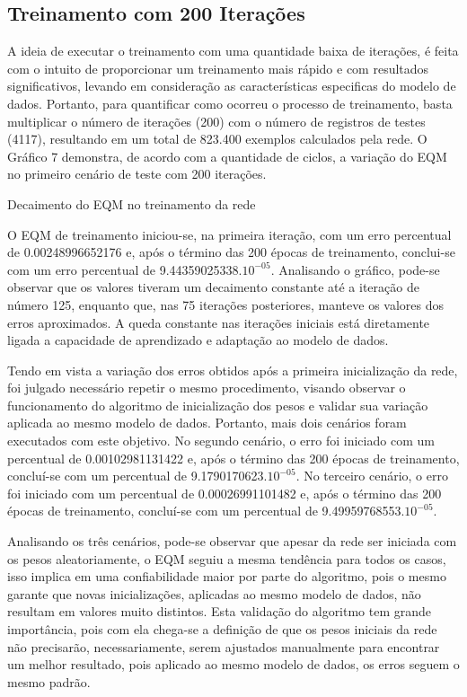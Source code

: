 \subsection{Treinamento com 200 Iterações}	
A ideia de executar o treinamento com uma quantidade baixa de iterações, é feita com o intuito de proporcionar um treinamento mais rápido e com resultados significativos, levando em consideração as características especificas do modelo de dados. Portanto, para quantificar como ocorreu o processo de treinamento, basta multiplicar o número de iterações (200) com o número de registros de testes (4117), resultando em um total de 823.400 exemplos calculados pela rede. O Gráfico 7 demonstra, de acordo com a quantidade de ciclos, a variação do EQM no primeiro cenário de teste com 200 iterações.
\begin{grafico}[h]
	\centering
	\caption{Decaimento do EQM no treinamento da rede}
	\label{lingua}
\end{grafico}

O EQM de treinamento iniciou-se, na primeira iteração, com um erro percentual de 0.00248996652176 e, após o término das 200 épocas de treinamento, conclui-se com um erro percentual de 9.44359025338.$10^{-05}$. Analisando o gráfico, pode-se observar que os valores tiveram um decaimento constante até a iteração de número 125, enquanto que, nas 75 iterações posteriores, manteve os valores dos erros aproximados. A queda constante nas iterações iniciais está diretamente ligada a capacidade de aprendizado e adaptação ao modelo de dados.

Tendo em vista a variação dos erros obtidos após a primeira inicialização da rede, foi julgado necessário repetir o mesmo procedimento, visando observar o funcionamento do algoritmo de inicialização dos pesos e validar sua variação aplicada ao mesmo modelo de dados. Portanto, mais dois cenários foram executados com este objetivo. No segundo cenário, o erro foi iniciado com um percentual de 0.00102981131422 e, após o término das 200 épocas de treinamento, concluí-se com um percentual de 9.1790170623.$10^{-05}$. No terceiro cenário, o erro foi iniciado com um percentual de 0.00026991101482 e, após o término das 200 épocas de treinamento, concluí-se com um percentual de 9.49959768553.$10^{-05}$.

Analisando os três cenários, pode-se observar que apesar da rede ser iniciada com os pesos aleatoriamente, o EQM seguiu a mesma tendência para todos os casos, isso implica em uma confiabilidade maior por parte do algoritmo, pois o mesmo garante que novas inicializações, aplicadas ao mesmo modelo de dados, não resultam em valores muito distintos. Esta validação do algoritmo tem grande importância, pois com ela chega-se a definição de que os pesos iniciais da rede não precisarão, necessariamente, serem ajustados manualmente para encontrar um melhor resultado, pois aplicado ao mesmo modelo de dados, os erros seguem o mesmo padrão.

